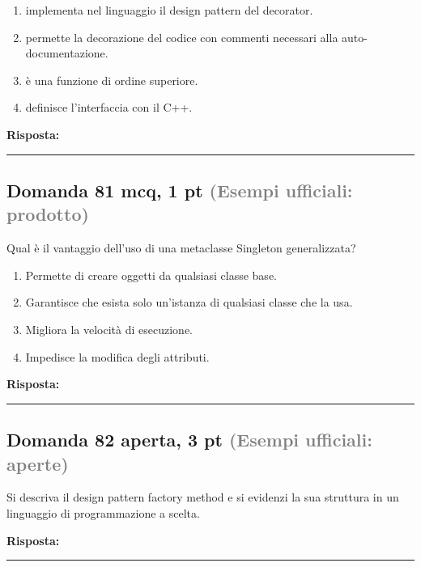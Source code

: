 \documentclass[a4paper,11pt]{article}
\begin{document}
\begin{enumerate}[label=\alph*)]
\item implementa nel linguaggio il design pattern del decorator.
\item permette la decorazione del codice con commenti necessari alla auto-documentazione.
\item è una funzione di ordine superiore.
\item definisce l'interfaccia con il C++.
\end{enumerate}
\vspace{0.2cm}
\noindent\textbf{Risposta:}\par
\vspace{1.5cm}\hrule


\subsection*{Domanda 81 \hfill {\small mcq, 1 pt \textcolor{gray}{(Esempi ufficiali: prodotto)}}}
Qual è il vantaggio dell'uso di una metaclasse Singleton generalizzata?

\begin{enumerate}[label=\alph*)]
\item Permette di creare oggetti da qualsiasi classe base.
\item Garantisce che esista solo un'istanza di qualsiasi classe che la usa.
\item Migliora la velocità di esecuzione.
\item Impedisce la modifica degli attributi.
\end{enumerate}
\vspace{0.2cm}
\noindent\textbf{Risposta:}\par
\vspace{1.5cm}\hrule


\subsection*{Domanda 82 \hfill {\small aperta, 3 pt \textcolor{gray}{(Esempi ufficiali: aperte)}}}
Si descriva il design pattern factory method e si evidenzi la sua struttura in un linguaggio di programmazione a scelta.

\vspace{0.2cm}
\noindent\textbf{Risposta:}\par
\vspace{4cm}\hrule


\end{document}
